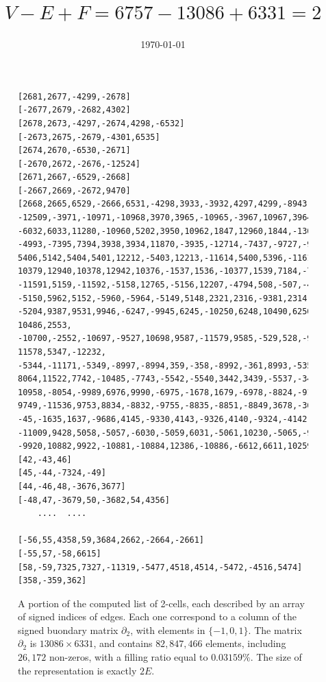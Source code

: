 \documentclass[11pt, oneside]{article}   	%
\title{$V-E+F=6757 - 13086 + 6331 = 2$}
\author{\today}
\date{}							%
\begin{document}
\maketitle



\begin{figure}[htbp] %
   \centering
   \begin{minipage}[c]{0.8\textwidth}
{\scriptsize
\begin{verbatim}
[2681,2677,-4299,-2678]
[-2677,2679,-2682,4302]
[2678,2673,-4297,-2674,4298,-6532]
[-2673,2675,-2679,-4301,6535]
[2674,2670,-6530,-2671]
[-2670,2672,-2676,-12524]
[2671,2667,-6529,-2668]
[-2667,2669,-2672,9470]
[2668,2665,6529,-2666,6531,-4298,3933,-3932,4297,4299,-8943,5803,2741,-2740,5804,-2743, 
-12509,-3971,-10971,-10968,3970,3965,-10965,-3967,10967,3964,-10964,3959,-10806,-3960, 
-6032,6033,11280,-10960,5202,3950,10962,1847,12960,1844,-13048,-1846,-12949,-4992,12948, 
-4993,-7395,7394,3938,3934,11870,-3935,-12714,-7437,-9727,-9725,10566,-5141,5408,5139,
5406,5142,5404,5401,12212,-5403,12213,-11614,5400,5396,-11612,4398,-11609,-4399,11610,
10379,12940,10378,12942,10376,-1537,1536,-10377,1539,7184,-7183,-2362,-2358,-11590,2359,
-11591,5159,-11592,-5158,12765,-5156,12207,-4794,508,-507,-4790,-3322,4791,-3324,-5153,
-5150,5962,5152,-5960,-5964,-5149,5148,2321,2316,-9381,2314,9380,2312,9383,-2313,9385,
-5204,9387,9531,9946,-6247,-9945,6245,-10250,6248,10490,6250,-10491,-6733,10489,6734,
10486,2553, -10700,-2552,-10697,-9527,10698,9587,-11579,9585,-529,528,-9586,11545,
11578,5347,-12232, -5344,-11171,-5349,-8997,-8994,359,-358,-8992,-361,8993,-5350,-11520,
8064,11522,7742,-10485,-7743,-5542,-5540,3442,3439,-5537,-3441,5539,8056,-10959,8053,
10958,-8054,-9989,6976,9990,-6975,-1678,1679,-6978,-8824,-9101,-8826,9100,-8829,-9750,
9749,-11536,9753,8834,-8832,-9755,-8835,-8851,-8849,3678,-3677,-4716,-4713,43,-42,-1638,
-45,-1635,1637,-9686,4145,-9330,4143,-9326,4140,-9324,-4142,9325,-1535,11008,1534,
-11009,9428,5058,-5057,-6030,-5059,6031,-5061,10230,-5065,-9925,-8561,12422,8560,-12421,
-9920,10882,9922,-10881,-10884,12386,-10886,-6612,6611,10259,-10260,-4643,4641,8047,4644]
[42,-43,46]
[45,-44,-7324,-49]
[44,-46,48,-3676,3677]
[-48,47,-3679,50,-3682,54,4356]
	....  ....

[-56,55,4358,59,3684,2662,-2664,-2661]
[-55,57,-58,6615]
[58,-59,7325,7327,-11319,-5477,4518,4514,-5472,-4516,5474]
[358,-359,362]
\end{verbatim}}
\end{minipage}
   \caption{A portion of the computed list of 2-cells, each described by an array of signed indices of edges. Each one correspond to a column of the signed buondary matrix $\partial_2$, with elements in $\{-1,0,1\}$. The matrix $\partial_2$ is $13086 \times 6331$, and contains $82,\!847,\!466$ elements, including $26,\!172$ non-zeros, with a filling ratio equal to $0.03159\%$. The size of the representation is exactly $2E$.}
   \label{fig:example}
\end{figure}
\end{document}
